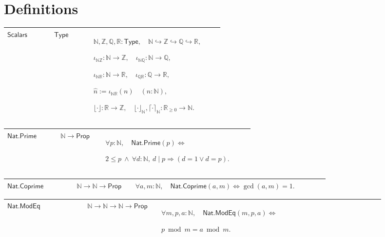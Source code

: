 \documentclass[12pt,reqno]{amsart}
\newcommand{\N}{\mathbb N}
\newcommand{\Z}{\mathbb Z}
\newcommand{\Q}{\mathbb Q}
\newcommand{\R}{\mathbb R}
\theoremstyle{blueplain}
\numberwithin{equation}{section}
\def\hyperlink#1#2{#2}}
\begin{document}
\section{Definitions}\label{sec:defs}
\begingroup
\scriptsize
\setlength{\parskip}{0pt}
\noindent
\begin{tabular}{|@{}p{0.19251\linewidth}|p{0.16845\linewidth}|p{0.53904\linewidth}|}\hline
{\hypertarget{def:Scalars}{\(\textsf{Scalars}\)}} & {\(\textsf{Type}\)} & {\(\displaystyle \N,\Z,\Q,\R:\textsf{Type},\quad\N\hookrightarrow\Z\hookrightarrow\Q\hookrightarrow\R,\)
\par
\(\displaystyle \iota_{\N\Z}:\N\to\Z,\quad\iota_{\N\Q}:\N\to\Q,\)
\par
\(\displaystyle \iota_{\N\R}:\N\to\R,\quad\iota_{\Q\R}:\Q\to\R,\)
\par
\(\displaystyle \widehat n:=\iota_{\N\R}(n)\quad(n:\N),\)
\par
\(\displaystyle \lfloor\cdot\rfloor:\R\to\Z,\quad\lfloor\cdot\rfloor_{\N},\lceil\cdot\rceil_{\N}:\R_{\ge0}\to\N.\)}\\
\hline
\end{tabular}%
\par\setlength{\parskip}{0pt}\nointerlineskip
\noindent
\begin{tabular}{|@{}p{0.19251\linewidth}|p{0.16845\linewidth}|p{0.53904\linewidth}|}\hline
{\hypertarget{def:Nat.Prime}{\(\textsf{Nat.Prime}\)}} & {\(\N\to\textsf{Prop}\)} & {\(\displaystyle \forall p:\N,\quad \hyperlink{def:Nat.Prime}{\ensuremath{\textsf{Nat.Prime}}}(p)\Longleftrightarrow\)
\par
\(\displaystyle 2\le p\ \wedge\ \forall d:\N,\ d\mid p\Rightarrow(d=1\vee d=p).\)}\\
\hline
\end{tabular}%
\par\setlength{\parskip}{0pt}\nointerlineskip
\noindent
\begin{tabular}{|@{}p{0.19251\linewidth}|p{0.16845\linewidth}|p{0.53904\linewidth}|}\hline
{\hypertarget{def:Nat.Coprime}{\(\textsf{Nat.Coprime}\)}} & {\(\N\to\N\to\textsf{Prop}\)} & {\(\displaystyle \forall a,m:\N,\quad \hyperlink{def:Nat.Coprime}{\ensuremath{\textsf{Nat.Coprime}}}(a,m)\Longleftrightarrow\gcd(a,m)=1.\)}\\
\hline
\end{tabular}%
\par\setlength{\parskip}{0pt}\nointerlineskip
\noindent
\begin{tabular}{|@{}p{0.19251\linewidth}|p{0.16845\linewidth}|p{0.53904\linewidth}|}\hline
{\hypertarget{def:Nat.ModEq}{\(\textsf{Nat.ModEq}\)}} & {\(\N\to\N\to\N\to\textsf{Prop}\)} & {\(\displaystyle \forall m,p,a:\N,\quad \hyperlink{def:Nat.ModEq}{\ensuremath{\textsf{Nat.ModEq}}}(m,p,a)\Longleftrightarrow\)
\par
\(\displaystyle p\bmod m=a\bmod m.\)}\\
\hline
\end{tabular}%
\end{document}
